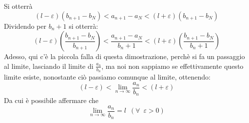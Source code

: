 \documentclass{article}
\theoremstyle{definition}
\begin{document}
        Si otterrà
\begin{equation}
     (l-\varepsilon)(b_{n+1}-b_N)<a_{n+1}-a_N<(l+\varepsilon)(b_{n+1}-b_N)
\end{equation}
Dividendo per $b_n+1$ si otterrà:
\begin{equation}
    (l-\varepsilon)(\frac{b_{n+1}-b_N}{b_{n+1}})<\frac{a_{n+1}-a_N}{b_n+1}<(l+\varepsilon)(\frac{b_{n+1}-b_N}{b_n+1})
\end{equation}
Adesso, qui c'è la piccola falla di questa dimostrazione, perchè si fa un passaggio al limite, lasciando il limite di $\frac{a_n}{b_n}$, ma noi non sappiamo se effettivamente questo limite esiste, nonostante ciò passiamo comunque al limite, ottenendo:
\begin{equation}
    (l-\varepsilon)<\lim_{n\to \infty} \frac{a_n}{b_n}<(l+\varepsilon)
\end{equation}
Da cui è possibile affermare che 
\begin{equation}
    \lim_{n \to \infty}\frac{a_n}{b_n}=l \,\,\, (\forall \,\,\, \varepsilon >0)
\end{equation}
\end{document}
